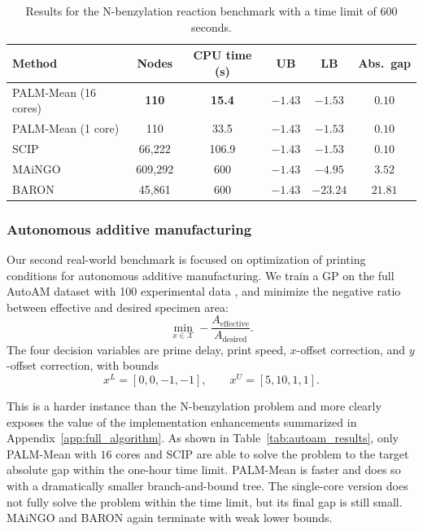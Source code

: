\documentclass[pdflatex,sn-mathphys-num]{sn-jnl}%
\theoremstyle{thmstyleone}%
\theoremstyle{thmstyletwo}%
\theoremstyle{thmstylethree}%
\begin{document}
\begin{table}[t]
    \centering
    \caption{Results for the N-benzylation reaction benchmark with a time limit of $600$ seconds.}
    \label{tab:benzylation_results}
    \begin{tabular}{lccccc}
        \toprule
        Method & Nodes & CPU time (s) & UB & LB & Abs.\ gap \\
        \midrule
        PALM-Mean (16 cores) & \textbf{110} & \textbf{15.4} & $-1.43$ & $-1.53$ & $0.10$ \\
        PALM-Mean (1 core)   & 110          & 33.5          & $-1.43$ & $-1.53$ & $0.10$ \\
        SCIP                 & 66,222       & 106.9         & $-1.43$ & $-1.53$ & $0.10$ \\
        MAiNGO               & 609,292      & 600           & $-1.43$ & $-4.95$ & $3.52$ \\
        BARON                & 45,861       & 600           & $-1.43$ & $-23.24$ & $21.81$ \\
        \bottomrule
    \end{tabular}
\end{table}

\subsubsection{Autonomous additive manufacturing}

Our second real-world benchmark is focused on optimization of printing conditions for autonomous additive manufacturing. We train a GP on the full AutoAM dataset with 100 experimental data \cite{ref:autoam_dataset,ref:autoam_bo}, and minimize the negative ratio between effective and desired specimen area:
\[
\min_{x\in\mathcal{X}} -\frac{A_{\mathrm{effective}}}{A_{\mathrm{desired}}}.
\]
The four decision variables are prime delay, print speed, $x$-offset correction, and $y$-offset correction, with bounds
\[
x^L=[0,0,-1,-1],
\qquad
x^U=[5,10,1,1].
\]

This is a harder instance than the N-benzylation problem and more clearly exposes the value of the implementation enhancements summarized in Appendix~\ref{app:full_algorithm}. As shown in Table~\ref{tab:autoam_results}, only PALM-Mean with $16$ cores and SCIP are able to solve the problem to the target absolute gap within the one-hour time limit. PALM-Mean is faster and does so with a dramatically smaller branch-and-bound tree. The single-core version does not fully solve the problem within the time limit, but its final gap is still small. MAiNGO and BARON again terminate with weak lower bounds.
\end{document}
